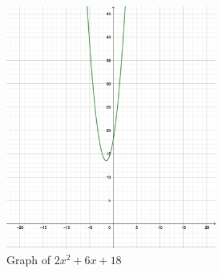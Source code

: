 \documentclass{article}
\begin{document}
\begin{figure}
  \includegraphics[height=8cm]{intro-to-quadratics-1.png}
  \caption{Graph of $2x^2+6x+18$}
\end{figure}
\end{document}
